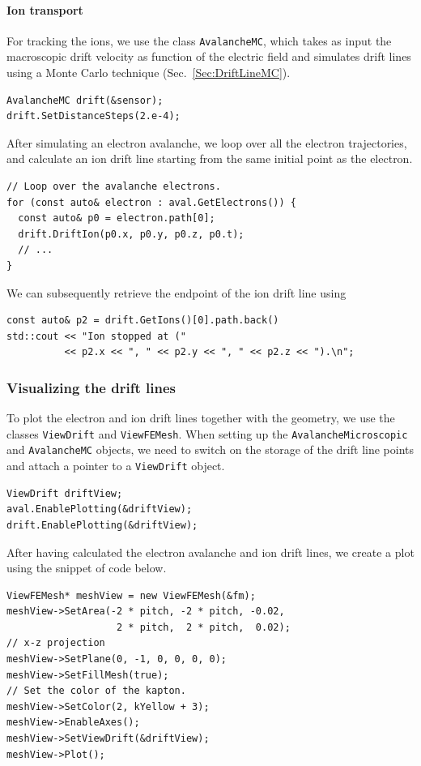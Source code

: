 \paragraph{Ion transport}
For tracking the ions, we use the class \texttt{AvalancheMC}, 
which takes as input the macroscopic drift velocity as 
function of the electric field and simulates drift lines using a 
Monte Carlo technique (Sec.~\ref{Sec:DriftLineMC}).
\begin{lstlisting}
AvalancheMC drift(&sensor);
drift.SetDistanceSteps(2.e-4);
\end{lstlisting}
After simulating an electron avalanche, we loop over all the electron
trajectories, and calculate an ion drift line starting from the same
initial point as the electron.
\begin{lstlisting}
// Loop over the avalanche electrons.
for (const auto& electron : aval.GetElectrons()) {
  const auto& p0 = electron.path[0];
  drift.DriftIon(p0.x, p0.y, p0.z, p0.t);
  // ...
}
\end{lstlisting}
We can subsequently retrieve the endpoint of the ion drift line using
\begin{lstlisting}
const auto& p2 = drift.GetIons()[0].path.back()
std::cout << "Ion stopped at (" 
          << p2.x << ", " << p2.y << ", " << p2.z << ").\n";
\end{lstlisting}
\subsubsection{Visualizing the drift lines}
To plot the electron and ion drift lines together with the geometry, 
we use the classes \texttt{ViewDrift} and \texttt{ViewFEMesh}. 
When setting up the \texttt{AvalancheMicroscopic} and \texttt{AvalancheMC} 
objects, we need to switch on the storage of the drift line points and 
attach a pointer to a \texttt{ViewDrift} object.
\begin{lstlisting}
ViewDrift driftView;
aval.EnablePlotting(&driftView);
drift.EnablePlotting(&driftView);
\end{lstlisting}
After having calculated the electron avalanche and ion drift lines, we create a plot using the snippet of code below.
\begin{lstlisting}
ViewFEMesh* meshView = new ViewFEMesh(&fm);
meshView->SetArea(-2 * pitch, -2 * pitch, -0.02,
                   2 * pitch,  2 * pitch,  0.02);
// x-z projection
meshView->SetPlane(0, -1, 0, 0, 0, 0);
meshView->SetFillMesh(true); 
// Set the color of the kapton.
meshView->SetColor(2, kYellow + 3);
meshView->EnableAxes();
meshView->SetViewDrift(&driftView);
meshView->Plot();
\end{lstlisting}

